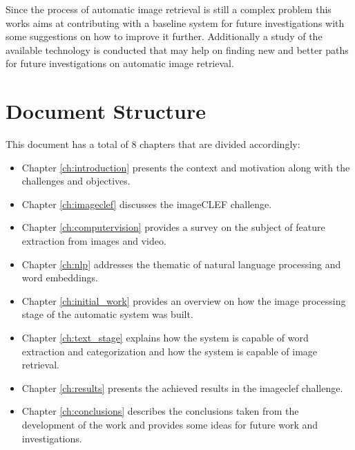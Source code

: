Since the process of automatic image retrieval is still a complex problem this works aims at contributing with a baseline system for future investigations with some suggestions on how to improve it further. Additionally a study of the available technology is conducted that may help on finding new and better paths for future investigations on automatic image retrieval.


\section{Document Structure}
This document has a total of 8 chapters that are divided accordingly:




\begin{itemize}
  \item Chapter \ref{ch:introduction} presents the context and motivation along with the challenges and objectives.
  \item Chapter \ref{ch:imageclef} discusses the imageCLEF challenge.
  \item Chapter \ref{ch:computervision} provides a survey on the subject of feature extraction from images and video.
  \item Chapter \ref{ch:nlp} addresses the thematic of natural language processing and word embeddings.
  \item Chapter \ref{ch:initial_work} provides an overview on how the image processing stage of the automatic system was built.
  \item Chapter \ref{ch:text_stage} explains how the system is capable of word extraction and categorization and how the system is capable of image retrieval.
  
  \item Chapter \ref{ch:results} presents the achieved results in the imageclef challenge.
  \item Chapter \ref{ch:conclusions} describes the conclusions taken from the development of the work and provides some ideas for future work and investigations.
  
 
 
\end{itemize}

